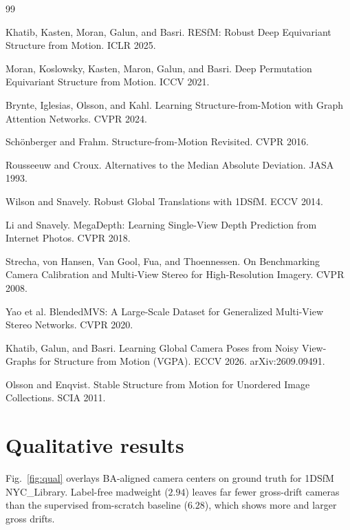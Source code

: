 \documentclass{article}
\newcommand{\mad}{madweight}
\begin{document}
\label{sec:endcontent}%
\begin{thebibliography}{99}\small

 Khatib, Kasten, Moran, Galun, and Basri. RESfM: Robust Deep Equivariant Structure from Motion. ICLR 2025.

 Moran, Koslowsky, Kasten, Maron, Galun, and Basri. Deep Permutation Equivariant Structure from Motion. ICCV 2021.

 Brynte, Iglesias, Olsson, and Kahl. Learning Structure-from-Motion with Graph Attention Networks. CVPR 2024.

 Sch\"onberger and Frahm. Structure-from-Motion Revisited. CVPR 2016.

 Rousseeuw and Croux. Alternatives to the Median Absolute Deviation. JASA 1993.

 Wilson and Snavely. Robust Global Translations with 1DSfM. ECCV 2014.

 Li and Snavely. MegaDepth: Learning Single-View Depth Prediction from Internet Photos. CVPR 2018.

 Strecha, von Hansen, Van Gool, Fua, and Thoennessen. On Benchmarking Camera Calibration and Multi-View Stereo for High-Resolution Imagery. CVPR 2008.

 Yao et al. BlendedMVS: A Large-Scale Dataset for Generalized Multi-View Stereo Networks. CVPR 2020.

 Khatib, Galun, and Basri. Learning Global Camera Poses from Noisy View-Graphs for Structure from Motion (VGPA). ECCV 2026. arXiv:2609.09491.

 Olsson and Enqvist. Stable Structure from Motion for Unordered Image Collections. SCIA 2011.

\end{thebibliography}


\appendix
\section{Qualitative results}\label{app:qual}
Fig.~\ref{fig:qual} overlays BA-aligned camera centers on ground truth for 1DSfM
NYC\_Library. Label-free \mad{} ($2.94$) leaves far fewer gross-drift cameras than the
supervised from-scratch baseline ($6.28$), which shows more and larger gross drifts.
\end{document}
